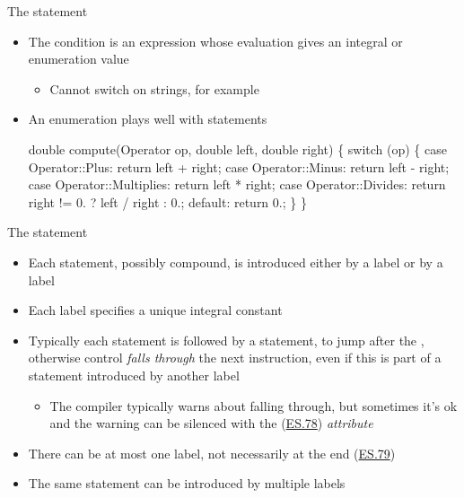 \begin{frame}[fragile]{The  statement \insertcontinuationtext}

  \begin{itemize}
  \item The condition is an expression whose evaluation gives an integral or
    enumeration value
    \begin{itemize}
    \item Cannot switch on strings, for example
    \end{itemize}

  \item An enumeration plays well with  statements

    \begin{codeblock}
double compute(Operator op, double left, double right)
\{
  switch (op) \{
    case Operator::Plus:       return left + right;
    case Operator::Minus:      return left - right;
    case Operator::Multiplies: return left * right;
    case Operator::Divides:    return right != 0. ? left / right : 0.;
    default: return 0.;
  \}
\}\end{codeblock}

  \end{itemize}
\end{frame}

\begin{frame}[fragile]{The  statement \insertcontinuationtext}
  \begin{itemize}
  \item Each statement, possibly compound, is introduced either by a 
    label or by a  label
  \item Each  label specifies a unique integral constant
  \item Typically each statement is followed by a  statement, to
    jump after the , otherwise control \textit{falls through} the
    next instruction, even if this is part of a statement introduced by another
    label
    \begin{itemize}
    \item The compiler typically warns about falling through, but sometimes it's
      ok and the warning can be silenced with the \code{[[fallthrough]]} (\href{https://isocpp.github.io/CppCoreGuidelines/CppCoreGuidelines#es78-dont-rely-on-implicit-fallthrough-in-switch-statements}{ES.78})
      \textit{attribute}
    \end{itemize}
  \item There can be at most one  label, not necessarily at the
    end (\href{https://isocpp.github.io/CppCoreGuidelines/CppCoreGuidelines#es79-use-default-to-handle-common-cases-only}{ES.79})
  \item The same statement can be introduced by multiple  labels
  \end{itemize}

\end{frame}
